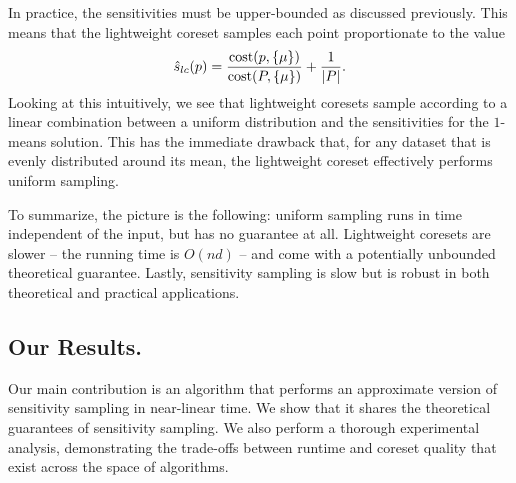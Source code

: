 In practice, the sensitivities must be upper-bounded as discussed previously. This means that the lightweight coreset samples each point proportionate to the
value
\[ \hat{s}_{lc}(p) = \dfrac{\operatorname{cost}(p, \{\mu\})}{\operatorname{cost}(P, \{\mu\})} + \dfrac{1}{|P|}.\]
Looking at this intuitively, we see that lightweight coresets sample according to a linear combination between a uniform distribution and the sensitivities for
the $1$-means solution. This has the immediate drawback that, for any dataset that is evenly distributed around its mean, the lightweight coreset effectively
performs uniform sampling.

To summarize, the picture is the following: uniform sampling runs in time independent of the input, but has no guarantee at all. Lightweight coresets are slower
-- the running time is $O(nd)$ -- and come with a potentially unbounded theoretical guarantee. Lastly, sensitivity sampling is slow but is robust in both
theoretical and practical applications.
 
%

\subsection{Our Results.}

Our main contribution is an algorithm that performs an approximate version of sensitivity sampling in near-linear time. We show that it shares the theoretical
guarantees of sensitivity sampling. We also perform a thorough experimental analysis, demonstrating the trade-offs between runtime and coreset quality that exist
across the space of algorithms.



